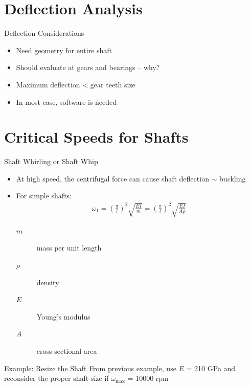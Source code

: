 \documentclass[10pt, svgnames]{beamer}
\begin{document}
\section{Deflection Analysis}
\label{sec:org08cc75c}

\begin{frame}[label={sec:org4284ec7}]{Deflection Considerations}
\begin{itemize}
\item Need geometry for entire shaft
\item Should evaluate at gears and bearings -- why?
\item Maximum deflection < gear teeth size
\item In most case, software is needed
\end{itemize}
\end{frame}

\section{Critical Speeds for Shafts}
\label{sec:org0300b55}

\begin{frame}[label={sec:orge4ac8aa}]{Shaft Whirling or Shaft Whip}
\begin{itemize}
\item At high speed, the centrifugal force can cause shaft deflection \(\sim\) buckling
\item For simple shafts:
\begin{align*}
  \omega_{1} = \left( \frac{\pi}{l} \right)^{2} \sqrt{ \frac{EI}{m} } = \left( \frac{\pi}{l} \right)^{2} \sqrt{ \frac{EI}{A \rho} }
\end{align*}

\begin{description}
\item[{\(m\)}] mass per unit length
\item[{\(\rho\)}] density
\item[{\(E\)}] Young's modulus
\item[{\(A\)}] cross-sectional area
\end{description}
\end{itemize}
\end{frame}

\begin{frame}[label={sec:org0782419}]{Example: Resize the Shaft}
From previous example, use \(E\) = 210 GPa and reconsider the proper shaft size if \(\omega_{\max}\) = 10000 rpm

\vfill
\end{frame}
\end{document}
